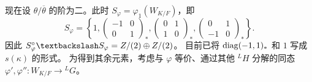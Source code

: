 现在设 $\theta/\overline\theta$ 的阶为二。此时
$S_\varphi=\varphi_1(W_{K/F})$，即
\[
S_\varphi=\left\{1,
\begin{pmatrix}-1&0\\0&1\end{pmatrix}_*,
\begin{pmatrix}0&1\\1&0\end{pmatrix}_*,
\begin{pmatrix}0&1\\-1&0\end{pmatrix}_*\right\}.
\]
因此 $S_\varphi^\circ\backslash S_\varphi=\Z/(2)\oplus\Z/(2)$。
目前已将 $\operatorname{diag}(-1,1)_*$ 和 $1$ 写成 $s(\kappa)$ 的形式。
为得到其余元素，考虑与 $\varphi$ 等价、通过其他 ${}^LH$ 分解的同态
$\varphi',\varphi'':W_{K/F}\to{}^LG$。

